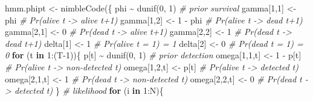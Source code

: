 \documentclass[
  12pt,
]{krantz}
\newenvironment{Shaded}{\begin{snugshade}}{\end{snugshade}}
\newcommand{\CommentTok}[1]{\textcolor[rgb]{0.56,0.35,0.01}{\textit{#1}}}
\newcommand{\ControlFlowTok}[1]{\textcolor[rgb]{0.13,0.29,0.53}{\textbf{#1}}}
\newcommand{\DecValTok}[1]{\textcolor[rgb]{0.00,0.00,0.81}{#1}}
\newcommand{\FunctionTok}[1]{\textcolor[rgb]{0.00,0.00,0.00}{#1}}
\newcommand{\NormalTok}[1]{#1}
\newcommand{\OtherTok}[1]{\textcolor[rgb]{0.56,0.35,0.01}{#1}}
\newcommand{\SpecialCharTok}[1]{\textcolor[rgb]{0.00,0.00,0.00}{#1}}
\begin{document}
\begin{Shaded}
\begin{Highlighting}[]
\NormalTok{hmm.phipt }\OtherTok{\textless{}{-}} \FunctionTok{nimbleCode}\NormalTok{(\{}
\NormalTok{  phi }\SpecialCharTok{\textasciitilde{}} \FunctionTok{dunif}\NormalTok{(}\DecValTok{0}\NormalTok{, }\DecValTok{1}\NormalTok{) }\CommentTok{\# prior survival}
\NormalTok{  gamma[}\DecValTok{1}\NormalTok{,}\DecValTok{1}\NormalTok{] }\OtherTok{\textless{}{-}}\NormalTok{ phi      }\CommentTok{\# Pr(alive t {-}\textgreater{} alive t+1)}
\NormalTok{  gamma[}\DecValTok{1}\NormalTok{,}\DecValTok{2}\NormalTok{] }\OtherTok{\textless{}{-}} \DecValTok{1} \SpecialCharTok{{-}}\NormalTok{ phi  }\CommentTok{\# Pr(alive t {-}\textgreater{} dead t+1)}
\NormalTok{  gamma[}\DecValTok{2}\NormalTok{,}\DecValTok{1}\NormalTok{] }\OtherTok{\textless{}{-}} \DecValTok{0}        \CommentTok{\# Pr(dead t {-}\textgreater{} alive t+1)}
\NormalTok{  gamma[}\DecValTok{2}\NormalTok{,}\DecValTok{2}\NormalTok{] }\OtherTok{\textless{}{-}} \DecValTok{1}        \CommentTok{\# Pr(dead t {-}\textgreater{} dead t+1)}
\NormalTok{  delta[}\DecValTok{1}\NormalTok{] }\OtherTok{\textless{}{-}} \DecValTok{1}          \CommentTok{\# Pr(alive t = 1) = 1}
\NormalTok{  delta[}\DecValTok{2}\NormalTok{] }\OtherTok{\textless{}{-}} \DecValTok{0}          \CommentTok{\# Pr(dead t = 1) = 0}
  \ControlFlowTok{for}\NormalTok{ (t }\ControlFlowTok{in} \DecValTok{1}\SpecialCharTok{:}\NormalTok{(T}\DecValTok{{-}1}\NormalTok{))\{}
\NormalTok{    p[t] }\SpecialCharTok{\textasciitilde{}} \FunctionTok{dunif}\NormalTok{(}\DecValTok{0}\NormalTok{, }\DecValTok{1}\NormalTok{) }\CommentTok{\# prior detection}
\NormalTok{    omega[}\DecValTok{1}\NormalTok{,}\DecValTok{1}\NormalTok{,t] }\OtherTok{\textless{}{-}} \DecValTok{1} \SpecialCharTok{{-}}\NormalTok{ p[t]    }\CommentTok{\# Pr(alive t {-}\textgreater{} non{-}detected t)}
\NormalTok{    omega[}\DecValTok{1}\NormalTok{,}\DecValTok{2}\NormalTok{,t] }\OtherTok{\textless{}{-}}\NormalTok{ p[t]        }\CommentTok{\# Pr(alive t {-}\textgreater{} detected t)}
\NormalTok{    omega[}\DecValTok{2}\NormalTok{,}\DecValTok{1}\NormalTok{,t] }\OtherTok{\textless{}{-}} \DecValTok{1}        \CommentTok{\# Pr(dead t {-}\textgreater{} non{-}detected t)}
\NormalTok{    omega[}\DecValTok{2}\NormalTok{,}\DecValTok{2}\NormalTok{,t] }\OtherTok{\textless{}{-}} \DecValTok{0}        \CommentTok{\# Pr(dead t {-}\textgreater{} detected t)}
\NormalTok{  \}}
  \CommentTok{\# likelihood}
  \ControlFlowTok{for}\NormalTok{ (i }\ControlFlowTok{in} \DecValTok{1}\SpecialCharTok{:}\NormalTok{N)\{}

\end{Highlighting}
\end{Shaded}
\end{document}
